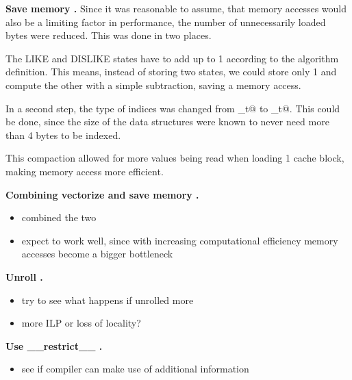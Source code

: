\documentclass[letterpaper]{article}
\newcommand{\mypar}[1]{{\bf #1.}}
\begin{document}
\mypar{Save memory }
Since it was reasonable to assume, that memory accesses would also be a limiting factor in performance, the number of unnecessarily loaded bytes were reduced. This was done in two places.

The LIKE and DISLIKE states have to add up to 1 according to the algorithm definition. This means, instead of storing two states, we could store only 1 and compute the other with a simple subtraction, saving a memory access.

In a second step, the type of indices was changed from \verb@size_t@ to _t@. This could be done, since the size of the data structures were known to never need more than 4 bytes to be indexed.

This compaction allowed for more values being read when loading 1 cache block, making memory access more efficient.

\mypar{Combining vectorize and save memory }
\begin{itemize}
\item combined the two
\item expect to work well, since with increasing computational efficiency memory accesses become a bigger bottleneck
\end{itemize}

\mypar{Unroll }
\begin{itemize}
\item try to see what happens if unrolled more
\item more ILP or loss of locality?
\end{itemize}

\mypar{Use \_\_restrict\_\_ }
\begin{itemize}
\item see if compiler can make use of additional information
\end{itemize}
\end{document}
